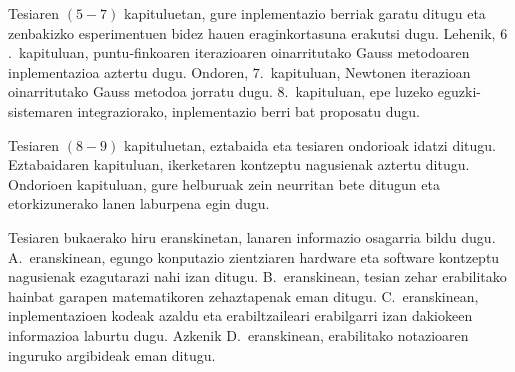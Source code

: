 Tesiaren $(5-7)$ kapituluetan, gure inplementazio berriak garatu ditugu eta zenbakizko esperimentuen bidez hauen eraginkortasuna erakutsi dugu. Lehenik, $6$.~kapituluan, puntu-finkoaren iterazioaren oinarritutako Gauss metodoaren inplementazioa aztertu dugu. Ondoren, $7$.~kapituluan, Newtonen iterazioan oinarritutako Gauss metodoa jorratu dugu. $8$.~kapituluan, epe luzeko eguzki-sistemaren integraziorako, inplementazio berri bat proposatu dugu.  

Tesiaren $(8-9)$ kapituluetan, eztabaida eta tesiaren ondorioak idatzi ditugu. Eztabaidaren kapituluan, ikerketaren kontzeptu nagusienak aztertu ditugu. Ondorioen kapituluan, gure helburuak zein neurritan bete ditugun eta etorkizunerako lanen laburpena egin dugu. 

Tesiaren bukaerako hiru eranskinetan, lanaren informazio osagarria bildu dugu. A.~eranskinean, egungo konputazio zientziaren hardware eta software kontzeptu nagusienak ezagutarazi nahi izan ditugu. B.~eranskinean, tesian zehar erabilitako hainbat garapen matematikoren zehaztapenak eman ditugu. C.~eranskinean, inplementazioen kodeak azaldu eta erabiltzaileari erabilgarri izan dakiokeen informazioa laburtu dugu. Azkenik D.~eranskinean, erabilitako notazioaren inguruko argibideak eman ditugu.

      
      

